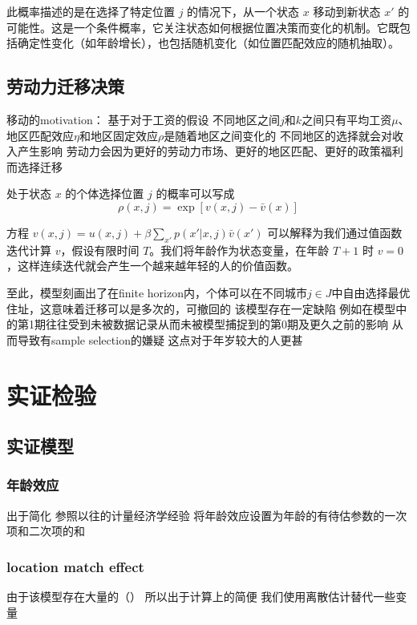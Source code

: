 \documentclass[a4paper,12pt]{article}
\begin{document}
此概率描述的是在选择了特定位置 $j$ 的情况下，从一个状态 $x$ 移动到新状态 $x'$ 的可能性。这是一个条件概率，它关注状态如何根据位置决策而变化的机制。它既包括确定性变化（如年龄增长），也包括随机变化（如位置匹配效应的随机抽取）。

\subsection{劳动力迁移决策}
移动的motivation：
基于对于工资的假设
不同地区之间$j$和$k$之间只有平均工资$\mu$、地区匹配效应$\eta$和地区固定效应$\rho$是随着地区之间变化的
不同地区的选择就会对收入产生影响
劳动力会因为更好的劳动力市场、更好的地区匹配、更好的政策福利而选择迁移


处于状态 $x$ 的个体选择位置 $j$ 的概率可以写成
\begin{equation}
  \rho(x,j)=\exp[v(x,j)-\bar v(x)]
\end{equation}

方程 $v(x, j) = u(x, j) + \beta \sum\limits_{x'} p(x' | x, j) \bar{v}(x')$ 可以解释为我们通过值函数迭代计算 $v$，假设有限时间 $T$。我们将年龄作为状态变量，在年龄 $T+1$ 时 $v=0$，这样连续迭代就会产生一个越来越年轻的人的价值函数。


至此，模型刻画出了在finite horizon内，个体可以在不同城市$j\in J$中自由选择最优住址，这意味着迁移可以是多次的，可撤回的
该模型存在一定缺陷
例如在模型中的第1期往往受到未被数据记录从而未被模型捕捉到的第0期及更久之前的影响
从而导致有sample selection的嫌疑
这点对于年岁较大的人更甚


\section{实证检验}

\subsection{实证模型} %
\label{sub:实证模型}
\subsubsection{年龄效应}
出于简化
参照以往的计量经济学经验
将年龄效应设置为年龄的有待估参数的一次项和二次项的和

\subsubsection{location match effect}
由于该模型存在大量的（）
所以出于计算上的简便
我们使用离散估计替代一些变量
\end{document}
